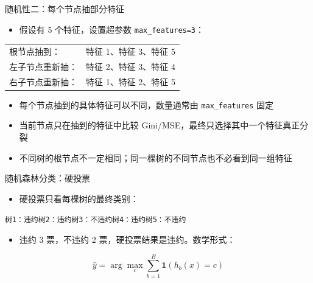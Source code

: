\documentclass[10pt,aspectratio=43]{beamer}
\begin{document}
\begin{frame}{随机性二：每个节点抽部分特征}
  \begin{itemize}
    \item 假设有 5 个特征，设置超参数 \texttt{max\_features=3}：
  \end{itemize}
  \begin{center}
  \begin{tabular}{ll}
    \toprule
    根节点抽到： & 特征 1、特征 3、特征 5 \\
    左子节点重新抽： & 特征 2、特征 3、特征 4 \\
    右子节点重新抽： & 特征 1、特征 2、特征 5 \\
    \bottomrule
  \end{tabular}
  \end{center}
  \begin{itemize}
    \item 每个节点抽到的具体特征可以不同，数量通常由 \texttt{max\_features} 固定
    \item 当前节点只在抽到的特征中比较 Gini/MSE，最终只选择其中一个特征真正分裂
    \item 不同树的根节点不一定相同；同一棵树的不同节点也不必看到同一组特征
  \end{itemize}
\end{frame}

\begin{frame}{随机森林分类：硬投票}
  \begin{itemize}
    \item 硬投票只看每棵树的最终类别：
  \end{itemize}
  \begin{center}
    \texttt{树1：违约\quad 树2：违约\quad 树3：不违约\quad 树4：违约\quad 树5：不违约}
  \end{center}
  \begin{itemize}
    \item 违约 3 票，不违约 2 票，硬投票结果是违约。数学形式：
  \end{itemize}
  \[
    \hat{y}=\arg\max_c\sum_{b=1}^{B}\mathbf{1}\left(h_b(x)=c\right)
  \]
\end{frame}
\end{document}
